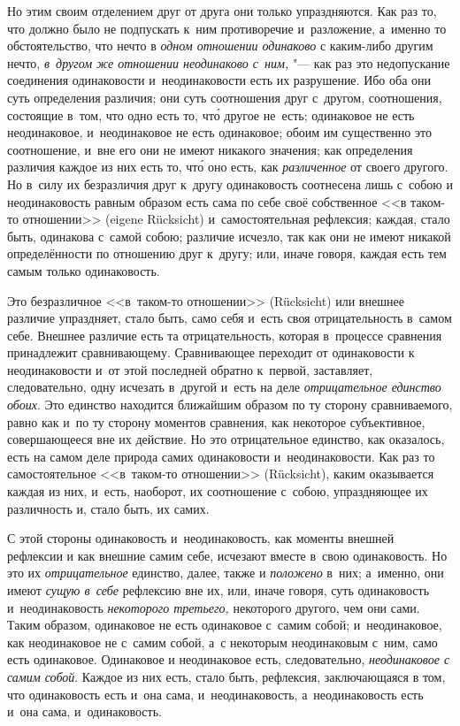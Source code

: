 Но этим своим отделением друг от друга они только упраздняются. Как раз то,
что должно было не подпускать к~ним противоречие и~разложение, а~именно то
обстоятельство, что нечто в {\em одном отношении одинаково}
с каким-либо другим нечто,
{\em в~другом же отношении неодинаково с~ним,} "--- как раз это
недопускание соединения одинаковости и~неодинаковости есть их разрушение.
Ибо оба они суть определения различия; они суть соотношения друг с~другом,
соотношения, состоящие в~том, что одно есть то, чт\'{о} другое не~есть;
одинаковое не есть неодинаковое, и~неодинаковое не есть одинаковое; обоим
им существенно это соотношение, и~вне его они не имеют никакого значения;
как определения различия каждое из них есть то, чт\'{о} оно есть, как
{\em различенное} от своего другого. Но в~силу их
безразличия друг к~другу одинаковость соотнесена лишь с~собою и
неодинаковость равным образом есть сама по себе своё собственное <<в
таком-то отношении>> (eigene Rücksicht) и~самостоятельная рефлексия; каждая,
стало быть, одинакова с~самой собою; различие исчезло, так как они не имеют
никакой определённости по отношению друг к~другу; или, иначе говоря, каждая
есть тем самым только одинаковость.

Это безразличное <<в~таком-то отношении>> (Rücksicht) или внешнее различие
упраздняет, стало быть, само себя и~есть своя отрицательность в~самом себе.
Внешнее различие есть та отрицательность, которая в~процессе сравнения
принадлежит сравнивающему. Сравнивающее переходит от одинаковости к
неодинаковости и~от этой последней обратно к~первой, заставляет,
следовательно, одну исчезать в~другой и~есть на деле
{\em отрицательное единство обоих}. Это единство
находится ближайшим образом по ту сторону сравниваемого, равно как и~по ту
сторону моментов сравнения, как некоторое субъективное, совершающееся вне
их действие. Но это отрицательное единство, как оказалось, есть на самом
деле природа самих одинаковости и~неодинаковости. Как раз то
самостоятельное <<в~таком-то отношении>> (Rücksicht), каким оказывается
каждая из них, и~есть, наоборот, их соотношение с~собою, упраздняющее их
различность и, стало быть, их самих.

С этой стороны одинаковость и~неодинаковость, как моменты внешней рефлексии
и как внешние самим себе, исчезают вместе в~свою одинаковость. Но это их
{\em отрицательное} единство, далее, также и
{\em положено} в~них; а~именно, они имеют
{\em сущую в~себе} рефлексию вне их, или, иначе говоря,
суть одинаковость и~неодинаковость {\em некоторого
третьего,} некоторого другого, чем они сами. Таким образом, одинаковое не
есть одинаковое с~самим собой; и~неодинаковое, как неодинаковое не с~самим
собой, а~с некоторым неодинаковым с~ним, само есть одинаковое. Одинаковое и
неодинаковое есть, следовательно, {\em неодинаковое с
самим собой}. Каждое из них есть, стало быть, рефлексия, заключающаяся в
том, что одинаковость есть и~она сама, и~неодинаковость, а~неодинаковость
есть и~она сама, и~одинаковость.

